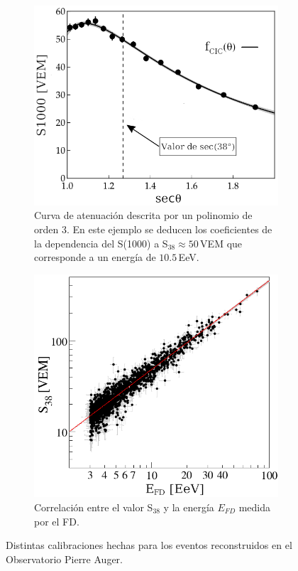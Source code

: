 \begin{figure}[H]
    \begin{subfigure}[t]{0.51\textwidth}
	\includegraphics[width=\textwidth]{s1000_theta.png}
	\caption{Curva de atenuación descrita por un polinomio de orden 3. En este ejemplo se deducen los coeficientes de la dependencia del S(1000) a S$_{38}\approx 50\,$VEM que corresponde a un energía de $10.5\,$EeV.} 	\label{fig:s1000_theta}
    \end{subfigure}%
    \hspace{\fill}
    \begin{subfigure}[t]{0.45\textwidth}
	\includegraphics[width=\textwidth]{efd_s38.png}
	\caption{Correlación entre el valor S$_{38}$ y la energía $E_{FD}$ medida por el FD.} 	\label{fig:efd_s38}
    \end{subfigure}%
    \caption{Distintas calibraciones hechas para los eventos reconstruidos en el Observatorio Pierre Auger.}
	\end{figure}




